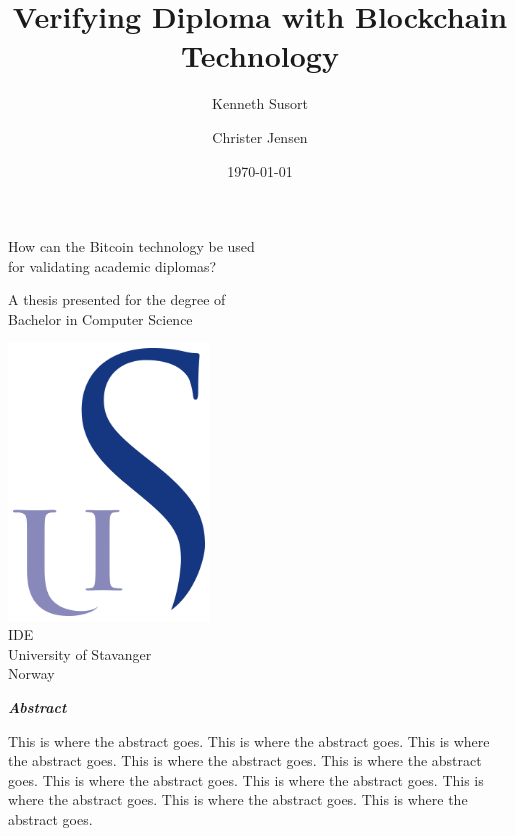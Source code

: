 \documentclass[11pt]{article}
\title{Verifying Diploma with Blockchain Technology}
\author{Kenneth Susort \and Christer Jensen}
\date{\today}
\begin{document}
\begin{titlepage}
	\begin{center}
		
		\huge
		\textbf{\thetitle}
		
		\vspace{0.5cm}
		\large
		How can the Bitcoin technology be used\\ for validating academic diplomas?
		
		\vspace{0.5cm}
		
		\textbf{\theauthor}
		
		\vfill
		
		A thesis presented for the degree of\\
		Bachelor in Computer Science
		
		\vspace{0.8cm}
		
		\includegraphics[width=0.4\textwidth]{university_logo.png}\\
		\large
		IDE\\
		University of Stavanger\\
		Norway\\
		\thedate
		
	\end{center}
\end{titlepage}

\begin{center}
	\vspace*{4cm}
	\textbf{\textit{Abstract}}
\end{center}


This is where the abstract goes. This is where the abstract goes. This is where the abstract goes. This is where the abstract goes. This is where the abstract goes. This is where the abstract goes. This is where the abstract goes. This is where the abstract goes. This is where the abstract goes. This is where the abstract goes.
\newpage
\end{document}
